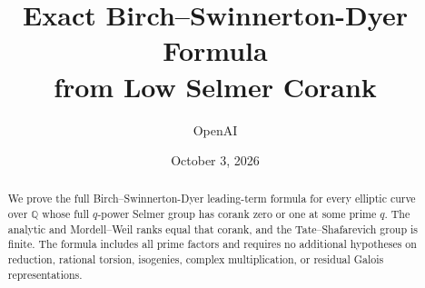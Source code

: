 \documentclass[11pt]{article}
\title{Exact Birch--Swinnerton-Dyer Formula\protect\\from Low Selmer Corank}
\author{OpenAI}
\date{October 3, 2026}
\numberwithin{equation}{section}
\theoremstyle{definition}
\theoremstyle{remark}
\newcommand{\Q}{\mathbb Q}
\begin{document}
\maketitle
\begin{abstract}
We prove the full Birch--Swinnerton-Dyer leading-term formula for every
elliptic curve over $\Q$ whose full $q$-power Selmer group has corank zero
or one at some prime $q$. The analytic and Mordell--Weil ranks equal
that corank, and the Tate--Shafarevich group is finite. The formula
includes all prime factors and requires no additional hypotheses on
reduction, rational torsion, isogenies, complex multiplication, or
residual Galois representations.
\end{abstract}
\tableofcontents











\end{document}
